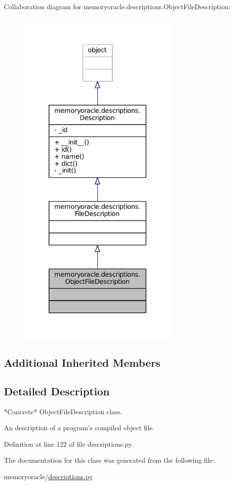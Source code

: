 Collaboration diagram for memoryoracle.\+descriptions.\+Object\+File\+Description\+:\nopagebreak
\begin{figure}[H]
\begin{center}
\leavevmode
\includegraphics[width=230pt]{classmemoryoracle_1_1descriptions_1_1ObjectFileDescription__coll__graph}
\end{center}
\end{figure}
\subsection*{Additional Inherited Members}


\subsection{Detailed Description}
\begin{DoxyVerb}*Concrete* ObjectFileDescription class.

An description of a program's compiled object file.
\end{DoxyVerb}
 

Definition at line 122 of file descriptions.\+py.



The documentation for this class was generated from the following file\+:\begin{DoxyCompactItemize}
\item 
memoryoracle/\hyperlink{descriptions_8py}{descriptions.\+py}\end{DoxyCompactItemize}
